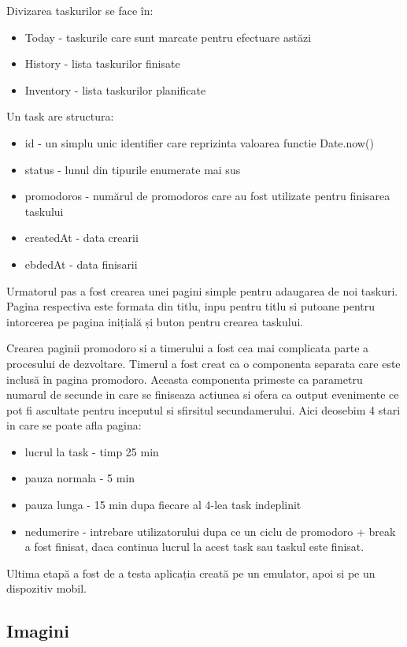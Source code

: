 Divizarea taskurilor se face în:
\begin{itemize}
	\item Today - taskurile care sunt marcate pentru efectuare astăzi
	\item History - lista taskurilor finisate
	\item Inventory - lista taskurilor planificate
\end{itemize}

Un task are structura: 
\begin{itemize}
	\item id - un simplu unic identifier care reprizinta valoarea functie Date.now()
	\item status - lunul din tipurile enumerate mai sus
	\item promodoros - numărul de promodoros care au fost utilizate pentru finisarea taskului
	\item createdAt - data crearii
	\item ebdedAt - data finisarii
\end{itemize}

Urmatorul pas a fost crearea unei pagini simple pentru adaugarea de noi taskuri. Pagina respectiva este formata din titlu, inpu pentru titlu si putoane pentru intorcerea pe pagina inițială și buton pentru crearea taskului. 

Crearea paginii promodoro si a timerului a fost cea mai complicata parte a procesului de dezvoltare. Timerul a fost creat ca o componenta separata care este inclusă în pagina promodoro. Aceasta componenta primeste ca parametru numarul de secunde in care se finiseaza actiunea si ofera ca output evenimente ce pot fi ascultate pentru inceputul si sfirsitul secundamerului. 
Aici deosebim 4 stari in care se poate afla pagina:
\begin{itemize}
	\item lucrul la task - timp 25 min
	\item pauza normala - 5 min
	\item pauza lunga - 15 min dupa fiecare al 4-lea task indeplinit
	\item nedumerire - intrebare utilizatorului dupa ce un ciclu de promodoro + break a fost finisat, daca continua lucrul la acest task sau taskul este finisat.
\end{itemize}

Ultima etapă a fost de a testa aplicația creată pe un emulator, apoi si pe un dispozitiv mobil.

\break
\subsection{Imagini}

